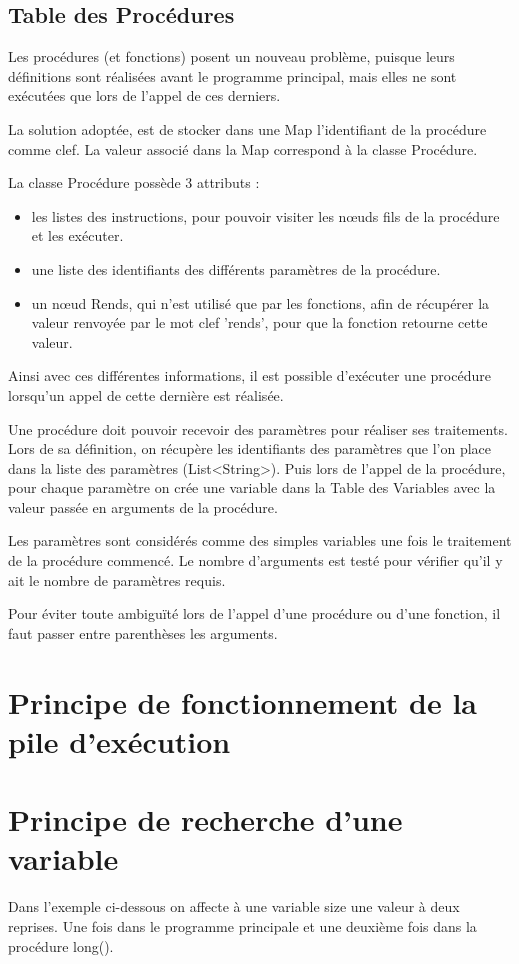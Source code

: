 \documentclass[a4paper,11pt]{article}
\begin{document}
\subsection{Table des Procédures}
Les procédures (et fonctions) posent un nouveau problème, puisque leurs définitions sont réalisées avant le programme principal, mais elles ne sont exécutées que lors de l'appel de ces derniers.

La solution adoptée, est de stocker dans une Map l'identifiant de la procédure comme clef. La valeur associé dans la Map correspond à la classe Procédure.

La classe Procédure possède 3 attributs :
\begin{itemize}
\item les listes des instructions, pour pouvoir visiter les nœuds fils de la procédure et les exécuter.
\item une liste des identifiants des différents paramètres de la procédure.   
\item un nœud Rends, qui n'est utilisé que par les fonctions, afin de récupérer la valeur renvoyée par le mot clef 'rends', pour que la fonction retourne cette valeur.
\end{itemize} 


Ainsi avec ces différentes informations, il est possible d'exécuter une procédure lorsqu'un appel de cette dernière est réalisée.

Une procédure doit pouvoir recevoir des paramètres pour réaliser ses traitements.
Lors de sa définition, on récupère les identifiants des paramètres que l'on place dans la liste des paramètres (List<String>). 
Puis lors de l'appel de la procédure, pour chaque paramètre on crée une variable dans la Table des Variables avec la valeur passée en arguments de la procédure. 

Les paramètres sont considérés comme des simples variables une fois le traitement de la procédure commencé.
Le nombre d'arguments est testé pour vérifier qu'il y ait le nombre de paramètres requis.

Pour éviter toute ambiguïté lors de l'appel d'une procédure ou d'une fonction, il faut passer entre parenthèses les arguments.  

\section{Principe de fonctionnement de la pile d'exécution}

\section{Principe de recherche d'une variable}
Dans l'exemple ci-dessous on affecte à une variable size une valeur à deux reprises. Une fois dans le programme principale et une deuxième fois dans la procédure long().
\end{document}
